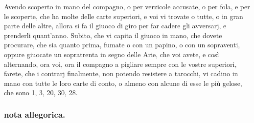 \documentclass[11pt,a6paper]{article}
\begin{document}
Avendo scoperto in mano del compagno,
o per verzicole accusate, o per fola, e
per le scoperte, che ha molte delle carte
superiori, e voi vi trovate o tutte, o in gran
parte delle altre, allora si fa il giuoco di giro
per far cadere gli avversarj, e prenderli
quant'anno. Subito, che vi capita il giuoco
in mano, che dovete procurare, che sia quanto
prima, fumate o con un papino, o con un
sopraventi, oppure giuocate un sopratrenta
in segno delle Arie, che voi avete, e così
alternando, ora voi, ora il compagno a pigliare
sempre con le vostre superiori, farete, che
i contrarj finalmente, non potendo resistere a
tarocchi, vi cadino in mano con tutte le loro
carte di conto, o almeno con alcune di esse
le più gelose, che sono 1, 3, 20, 30, 28.

\subsubsection{nota allegorica.}
\end{document}
